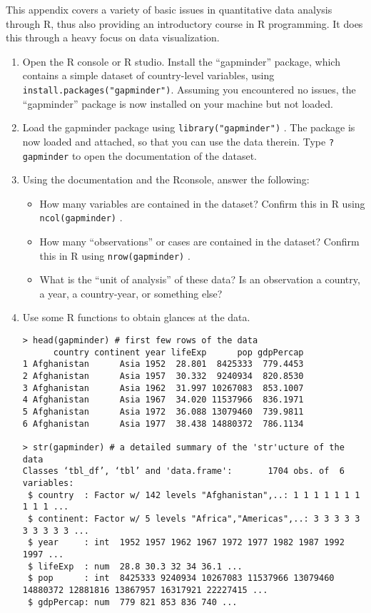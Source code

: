 \documentclass[a4paper,12pt]{article}
\begin{document}
This appendix covers a variety of basic issues in quantitative data analysis through R, thus also providing an introductory course in R programming. It does this through a heavy focus on data visualization.

\begin{enumerate}\itemsep2em
\item Open the R console or R studio. Install the ``gapminder'' package, which contains a simple dataset of country-level variables, using \texttt{install.packages("gapminder")}. Assuming you encountered no issues, the ``gapminder'' package is now installed on your machine but not loaded.

\item Load the gapminder package using \texttt{library("gapminder")} . The package is now loaded and attached, so that you can use the data therein. Type \texttt{? gapminder} to open the documentation of the dataset.

\item Using the documentation and the Rconsole, answer the following:

	\begin{itemize}
	\item How many variables are contained in the dataset? Confirm this in R using \texttt{ncol(gapminder)} .
	\item How many ``observations'' or cases are contained in the dataset? Confirm this in R using \texttt{nrow(gapminder)} .
	\item What is the ``unit of analysis'' of these data? Is an observation a country, a year, a country-year, or something else?
	\end{itemize}

\item Use some R functions to obtain glances at the data. 

\begin{verbatim}
> head(gapminder) # first few rows of the data
      country continent year lifeExp      pop gdpPercap
1 Afghanistan      Asia 1952  28.801  8425333  779.4453
2 Afghanistan      Asia 1957  30.332  9240934  820.8530
3 Afghanistan      Asia 1962  31.997 10267083  853.1007
4 Afghanistan      Asia 1967  34.020 11537966  836.1971
5 Afghanistan      Asia 1972  36.088 13079460  739.9811
6 Afghanistan      Asia 1977  38.438 14880372  786.1134

> str(gapminder) # a detailed summary of the 'str'ucture of the data
Classes ‘tbl_df’, ‘tbl’ and 'data.frame':       1704 obs. of  6 variables:
 $ country  : Factor w/ 142 levels "Afghanistan",..: 1 1 1 1 1 1 1 1 1 1 ...
 $ continent: Factor w/ 5 levels "Africa","Americas",..: 3 3 3 3 3 3 3 3 3 3 ...
 $ year     : int  1952 1957 1962 1967 1972 1977 1982 1987 1992 1997 ...
 $ lifeExp  : num  28.8 30.3 32 34 36.1 ...
 $ pop      : int  8425333 9240934 10267083 11537966 13079460 14880372 12881816 13867957 16317921 22227415 ...
 $ gdpPercap: num  779 821 853 836 740 ...


\end{verbatim}
\end{enumerate}
\end{document}
